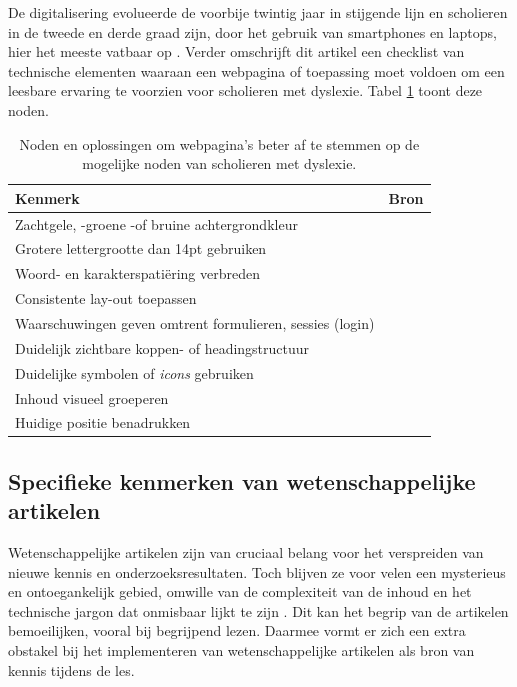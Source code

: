 De digitalisering evolueerde de voorbije twintig jaar in stijgende lijn en scholieren in de tweede en derde graad zijn, door het gebruik van smartphones en laptops, hier het meeste vatbaar op \autocite{Fernando2021}. Verder omschrijft dit artikel een checklist van technische elementen waaraan een webpagina of toepassing moet voldoen om een leesbare ervaring te voorzien voor scholieren met dyslexie. Tabel \ref{table:dyslexia-necessaries} toont deze noden.

\begin{center}
		\begin{table}[H]
	\begin{tabular}{ | m{8cm} | m{7cm} | } 
		\hline
		Kenmerk & Bron \\
		\hline
		Zachtgele, -groene -of bruine achtergrondkleur 	& \textcite{Santana2012, Rello2017} 	\\ \hline
		Grotere lettergrootte dan 14pt gebruiken		& \autocite{Rello2015} 					\\ \hline
		Woord- en karakterspatiëring verbreden 			& \textcite{Santana2012, Rello2013b} 	\\ \hline
		Consistente lay-out toepassen					& \autocite{Rello2015, Fernando2021} 	\\  \hline
		Waarschuwingen geven omtrent formulieren, sessies (login) & \autocite{Fernando2021}  	\\ \hline
		Duidelijk zichtbare koppen- of headingstructuur & \autocite{Rello2012a} 				\\ \hline
		Duidelijke symbolen of \textit{icons} gebruiken & \autocite{Rello2012} 					\\ \hline
		Inhoud visueel groeperen 						& \autocite{Rello2015, Fernando2021}	\\ \hline
		Huidige positie benadrukken 					& \autocite{Fernando2021} 				\\ \hline
		
	\end{tabular}
	\caption{Noden en oplossingen om webpagina's beter af te stemmen op de mogelijke noden van scholieren met dyslexie.}
	\label{table:dyslexia-necessaries}
	\end{table}
\end{center}

\subsection{Specifieke kenmerken van wetenschappelijke artikelen}

Wetenschappelijke artikelen zijn van cruciaal belang voor het verspreiden van nieuwe kennis en onderzoeksresultaten. Toch blijven ze voor velen een mysterieus en ontoegankelijk gebied, omwille van de complexiteit van de inhoud en het technische jargon dat onmisbaar lijkt te zijn \autocite{Ball2017}. Dit kan het begrip van de artikelen bemoeilijken, vooral bij begrijpend lezen. Daarmee vormt er zich een extra obstakel bij het implementeren van wetenschappelijke artikelen als bron van kennis tijdens de les. 


